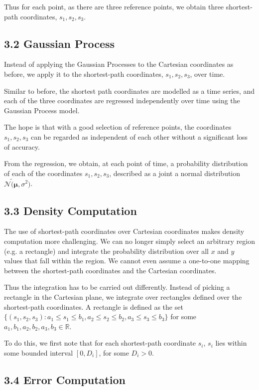 \documentclass[letterpaper]{article}
\begin{document}
Thus for each point, as there are three reference points, we obtain three shortest-path coordinates, $s_1, s_2, s_3$.

\subsection{3.2  Gaussian Process}

Instead of applying the Gaussian Processes to the Cartesian coordinates as before, we apply it to the shortest-path coordinates, $s_1, s_2, s_3$, over time.

Similar to before, the shortest path coordinates are modelled as a time series, and each of the three coordinates are regressed independently over time using the Gaussian Process model.

The hope is that with a good selection of reference points, the coordinates $s_1, s_2, s_3$ can be regarded as independent of each other without a significant loss of accuracy.

From the regression, we obtain, at each point of time, a probability distribution of each of the coordinates $s_1, s_2, s_3$, described as a joint a normal distribution $\mathcal{N}\tilde (\boldsymbol{\mu},\sigma^2)$.

\subsection{3.3  Density Computation}

The use of shortest-path coordinates over Cartesian coordinates makes density computation more challenging. We can no longer simply select an arbitrary region (e.g. a rectangle) and integrate the probability distribution over all $x$ and $y$ values that fall within the region. We cannot even assume a one-to-one mapping between the shortest-path coordinates and the Cartesian coordinates.

Thus the integration has to be carried out differently. Instead of picking a rectangle in the Cartesian plane, we integrate over rectangles defined over the shortest-path coordinates. A rectangle is defined as the set $\{(s_1,s_2,s_3) : a_1\leq s_1\leq b_1, a_2\leq s_2\leq b_2, a_3\leq s_3\leq b_3\}$ for some $a_1,b_1,a_2,b_2,a_3,b_3 \in \mathbb{R}$.

To do this, we first note that for each shortest-path coordinate $s_i$, $s_i$ lies within some bounded interval $[0,D_i]$, for some $D_i > 0$.



\subsection{3.4  Error Computation}
\end{document}
